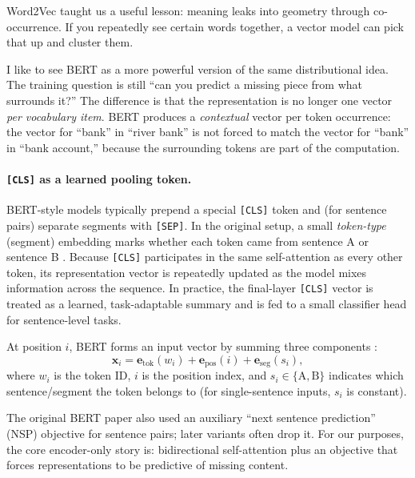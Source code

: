 \begin{tcolorbox}[summarybox, title={Author's note: Word2Vec vs.\ BERT (the intuition that still helps)}]
Word2Vec \citep{Mikolov2013} taught us a useful lesson: meaning leaks into geometry through co-occurrence. If you repeatedly see certain words together, a vector model can pick that up and cluster them.

I like to see BERT as a more powerful version of the same distributional idea. The training question is still ``can you predict a missing piece from what surrounds it?'' The difference is that the representation is no longer one vector \emph{per vocabulary item}. BERT produces a \emph{contextual} vector per token occurrence: the vector for ``bank'' in ``river bank'' is not forced to match the vector for ``bank'' in ``bank account,'' because the surrounding tokens are part of the computation.
\end{tcolorbox}

\paragraph{\texttt{[CLS]} as a learned pooling token.}
BERT-style models typically prepend a special \texttt{[CLS]} token and (for sentence pairs) separate segments with \texttt{[SEP]}. In the original setup, a small \emph{token-type} (segment) embedding marks whether each token came from sentence A or sentence B \citep{Devlin2019}. Because \texttt{[CLS]} participates in the same self-attention as every other token, its representation vector is repeatedly updated as the model mixes information across the sequence. In practice, the final-layer \texttt{[CLS]} vector is treated as a learned, task-adaptable summary and is fed to a small classifier head for sentence-level tasks.

\begin{tcolorbox}[summarybox, title={BERT inputs in one line (token + position + segment)}]
At position \(i\), BERT forms an input vector by summing three components \citep{Devlin2019}:
\[
\mathbf{x}_i
= \mathbf{e}_{\text{tok}}(w_i)
+ \mathbf{e}_{\text{pos}}(i)
+ \mathbf{e}_{\text{seg}}(s_i),
\]
where \(w_i\) is the token ID, \(i\) is the position index, and \(s_i\in\{\mathrm{A},\mathrm{B}\}\) indicates which sentence/segment the token belongs to (for single-sentence inputs, \(s_i\) is constant).
\end{tcolorbox}

The original BERT paper also used an auxiliary ``next sentence prediction'' (NSP) objective for sentence pairs; later variants often drop it. For our purposes, the core encoder-only story is: bidirectional self-attention plus an objective that forces representations to be predictive of missing content.

